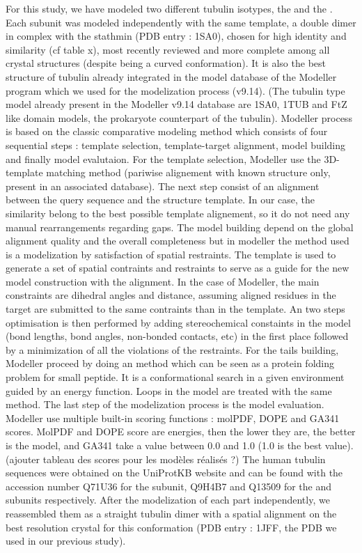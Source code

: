 \documentclass[a4paper]{article}
\begin{document}
For this study, we have modeled two different tubulin isotypes, the  and the . Each
subunit was modeled independently with the same template, a double dimer in complex with the stathmin
(PDB entry : 1SA0), chosen for high identity and similarity (cf table x), most recently reviewed and more complete
among all crystal structures (despite being a curved conformation). It is also the best structure of tubulin
already integrated in the model database of the Modeller program which we used for the modelization process (v9.14).
(The tubulin type model already present in the Modeller v9.14 database are 1SA0, 1TUB and FtZ like domain models, the
prokaryote counterpart of the tubulin).
Modeller process is based on the classic comparative modeling method which consists of four
sequential steps : template selection, template-target alignment, model building and finally
model evalutaion. For the template selection, Modeller use the 3D-template matching method
(pariwise alignement with known structure only, present in an associated database). The next
step consist of an alignment between the query sequence and the structure template. In our
case, the similarity belong to the best possible template alignement, so it do not need any manual
rearrangements regarding gaps. The model building depend on the global alignment quality and the overall
completeness but in modeller the method used is a modelization by satisfaction of spatial restraints.
The template is used to generate a set of spatial contraints and restraints to serve as a guide for
the new model construction with the alignment. In the case of Modeller, the main constraints are
dihedral angles and distance, assuming aligned residues in the target are submitted to the same contraints
than in the template. An two steps optimisation is then performed by adding stereochemical constaints in the
model (bond lengths, bond angles, non-bonded contacts, etc) in the first place followed by a minimization
of all the violations of the restraints. For the tails building, Modeller proceed by doing an 
method which can be seen as a protein folding problem for small peptide. It is a conformational search
in a given environment guided by an energy function. Loops in the model are treated with the same method.
The last step of the modelization process is the model evaluation. Modeller use multiple built-in scoring
functions : molPDF, DOPE and GA341 scores. MolPDF and DOPE score are energies, then the lower they are, the better
is the model, and GA341 take a value between 0.0 and 1.0 (1.0 is the best value). (ajouter tableau des scores
pour les modèles réalisés ?)
The human tubulin sequences were obtained on the UniProtKB
website and can be found with the accession number Q71U36 for the \alpha subunit, Q9H4B7 and Q13509
for the  and  subunits respectively. After the modelization of each part independently, we reassembled them
as a straight tubulin dimer with a spatial alignment on the best resolution crystal for this conformation
(PDB entry : 1JFF, the PDB we used in our previous study).
\end{document}
